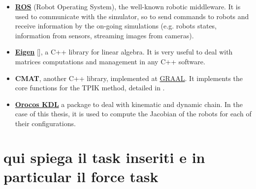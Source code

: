 \begin{itemize}
	\item \href{http://www.ros.org/}{\textbf{ROS}} (Robot Operating System), the well-known robotic middleware. It is used to communicate with the simulator, so to send commands to robots and receive information by the on-going simulations (e.g. robots states, information from sensors, streaming images from cameras).
	
	\item \href{http://eigen.tuxfamily.org/index.php?title=Main_Page}{\textbf{Eigen}} [\cite{eigen}], a C++ library for linear algebra. It is very useful to deal with matrices computations and management in any C++ software.
	
	\item \textbf{CMAT}, another C++ library, implemented at \href{http://www.graal.dibris.unige.it/}{GRAAL}. It implements the core functions for the TPIK method, detailed in \cite{IntroMaris1}.
	
	\item \href{http://www.orocos.org/kdl}{\textbf{Orocos KDL}} a package to deal with kinematic and dynamic chain. In the case of this thesis, it is used to compute the Jacobian of the robots for each of their configurations.
\end{itemize}


\section{qui spiega il task inseriti e in particular il force task}

